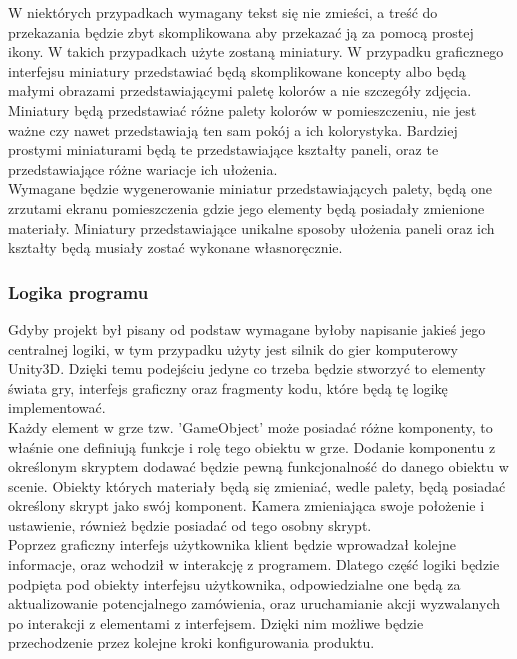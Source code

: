 \documentclass{article} %
\begin{document}
            W niektórych przypadkach wymagany tekst się nie zmieści, a treść do przekazania będzie zbyt skomplikowana aby przekazać ją za pomocą prostej ikony. W takich przypadkach użyte zostaną miniatury. W przypadku graficznego interfejsu miniatury przedstawiać będą skomplikowane koncepty albo będą małymi obrazami przedstawiającymi paletę kolorów a nie szczegóły zdjęcia. Miniatury będą przedstawiać różne palety kolorów w pomieszczeniu, nie jest ważne czy nawet przedstawiają ten sam pokój a ich kolorystyka. Bardziej prostymi miniaturami będą te przedstawiające kształty paneli, oraz te przedstawiające różne wariacje ich ułożenia.
            \\
            
            Wymagane będzie wygenerowanie miniatur przedstawiających palety, będą one zrzutami ekranu pomieszczenia gdzie jego elementy będą posiadały zmienione materiały. Miniatury przedstawiające unikalne sposoby ułożenia paneli oraz ich kształty będą musiały zostać wykonane własnoręcznie.
            \\
            
        \subsubsection{Logika programu}
        Gdyby projekt był pisany od podstaw wymagane byłoby napisanie jakieś jego centralnej logiki, w tym przypadku użyty jest silnik do gier komputerowy Unity3D. Dzięki temu podejściu jedyne co trzeba będzie stworzyć to elementy świata gry, interfejs graficzny oraz fragmenty kodu, które będą tę logikę implementować.
        \\
        
        Każdy element w grze tzw. 'GameObject' może posiadać różne komponenty, to właśnie one definiują funkcje i rolę tego obiektu w grze. Dodanie komponentu z określonym skryptem dodawać będzie pewną funkcjonalność do danego obiektu w scenie. Obiekty których materiały będą się zmieniać, wedle palety, będą posiadać określony skrypt jako swój komponent. Kamera zmieniająca swoje położenie i ustawienie, również będzie posiadać od tego osobny skrypt. \cite{unity}
        \\
 
        Poprzez graficzny interfejs użytkownika klient będzie wprowadzał kolejne informacje, oraz wchodził w interakcję z programem. Dlatego część logiki będzie podpięta pod obiekty interfejsu użytkownika, odpowiedzialne one będą za aktualizowanie potencjalnego zamówienia, oraz uruchamianie akcji wyzwalanych po interakcji z elementami z interfejsem. Dzięki nim możliwe będzie przechodzenie przez kolejne kroki konfigurowania produktu.
        \\
        
\end{document}
